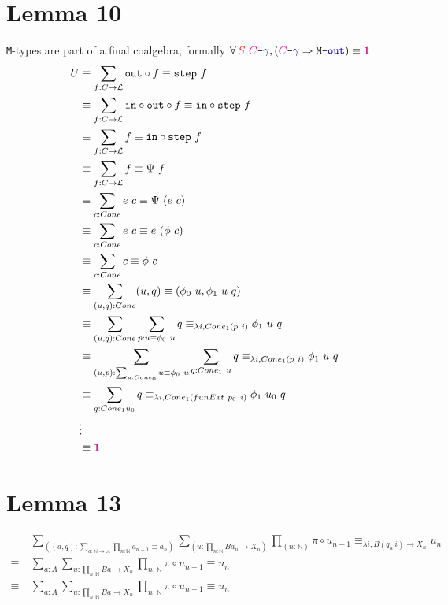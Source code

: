 \documentclass[twoside,11pt,openright]{report}
\newcommand*{\term}[1]{\textcolor{blue!80!black}{#1}}
\newcommand*{\type}[1]{\textcolor{magenta!90!black}{#1}}
\newcommand*{\container}[1]{\textcolor{red}{#1}}
\newcommand*{\unit}{\type{\textbf{1}}}
\newcommand*{\coalg}[2]{#1\texttt{-}#2}
\newcommand*{\typeformer}[1]{\ensuremath{\mathtt{#1}}}
\begin{document}
\section{Lemma 10}
\texttt{M}-types are part of a final coalgebra, formally \(\forall\,\container{S}~\coalg{\type{C}}{\term{\gamma}}, (\coalg{\type{C}}{\term{\gamma}} \Rightarrow \coalg{\typeformer{M}}{\term{\mathtt{out}}}) \equiv \unit\)
\begin{align}
  U &\equiv \sum_{f : C \rightarrow \mathcal{L}} \mathtt{out} \circ f \equiv \mathtt{step}~f \\
    &\equiv \sum_{f : C \rightarrow \mathcal{L}} \mathtt{in} \circ \mathtt{out} \circ f \equiv \mathtt{in} \circ \mathtt{step}~f\\
    &\equiv \sum_{f : C \rightarrow \mathcal{L}} f \equiv \mathtt{in} \circ \mathtt{step}~f\\
    &\equiv \sum_{f : C \rightarrow \mathcal{L}} f \equiv \Psi~f\\
    &\equiv \sum_{c : Cone} e~c \equiv \Psi~(e~c)\\
    &\equiv \sum_{c : Cone} e~c \equiv e~(\phi~c) \\
    &\equiv \sum_{c : Cone} c \equiv \phi~c \\
    &\equiv \sum_{(u,q) : Cone} (u , q) \equiv (\phi_0~u , \phi_1~u~q) \\
    &\equiv \sum_{(u,q) : Cone} \sum_{p : u \equiv \phi_0~u} q \equiv_{\lambda i, Cone_1 (p~i)} \phi_1~u~q \\
    &\equiv \sum_{(u,p) : \sum_{u : Cone_0} u \equiv \phi_0~u} \sum_{q : Cone_1~u} q \equiv_{\lambda i, Cone_1 (p~i)} \phi_1~u~q \\
    &\equiv \sum_{q : Cone_1 u_0} q \equiv_{\lambda i, Cone_1 (funExt~p_0~i)} \phi_1~u_0~q \\
    &\vdots \\
    &\equiv \unit
\end{align}

\section{Lemma 13}
\begin{align}
  &~\sum_{((a,q):\sum_{a : \mathbb{N} \rightarrow A} \prod_{n : \mathbb{N}} a_{n+1} \equiv a_n)} \sum_{(u : \prod_{n : \mathbb{N}} B a_n \rightarrow X_n)} \prod_{(n : \mathbb{N})} \pi \circ u_{n + 1} \equiv_{\lambda i, B (q_n~i) \rightarrow X_n} u_n \\
  \equiv&~\sum_{a : A} \sum_{u : \prod_{n : \mathbb{N}} B a \rightarrow X_n} \prod_{n : \mathbb{N}} \pi \circ u_{n+1} \equiv u_n \\
  \equiv&~\sum_{a : A} \sum_{u : \prod_{n : \mathbb{N}} B a \rightarrow X_n} \prod_{n : \mathbb{N}} \pi \circ u_{n+1} \equiv u_n
\end{align}
\end{document}
